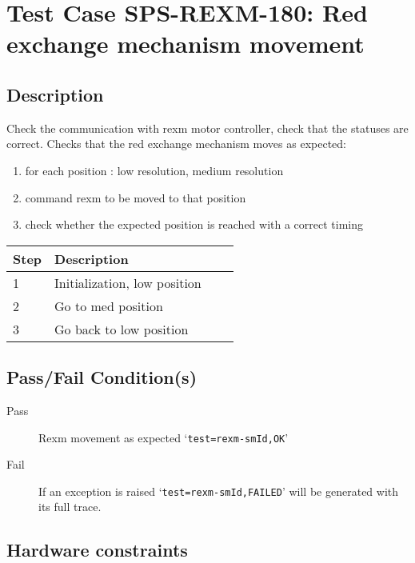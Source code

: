 \section{Test Case SPS-REXM-180: Red exchange mechanism movement}
\subsection{Description}

Check the communication with rexm motor controller, check that the statuses are correct.
Checks that the red exchange mechanism moves as expected:

\begin{enumerate}
    \item for each position : low resolution, medium resolution
        \item command rexm to be moved to that position
        \item check whether the expected position is reached with a correct timing
\end{enumerate}

\begin{table}[H]
    \begin{tabular}{|l| p{5cm} |l| p{5cm} |}
    \hline
    {\bf Step} & {\bf Description}  \\ \hline
    1 & Initialization, low position \\ \hline
    2 & Go to med position \\ \hline
    3 & Go back to low position \\ \hline
    \end{tabular}
\end{table}

\subsection{Pass/Fail Condition(s)}

\begin{description}
\item [Pass] Rexm movement as expected `\texttt{test=rexm-smId,OK}'
\item [Fail] If an exception is raised `\texttt{test=rexm-smId,FAILED}' will be generated with its full trace.
\end{description}

\subsection{Hardware constraints}

